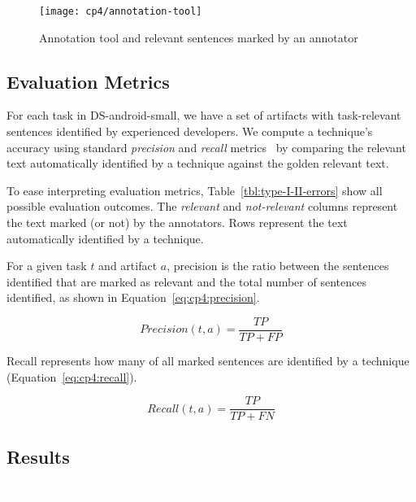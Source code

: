 \begin{figure}
    \centering
    \texttt{[image: cp4/annotation-tool]}
    \caption{Annotation tool and relevant sentences marked by an annotator}
    \label{fig:corpus-annotation-tool}
\end{figure}



\subsection{Evaluation Metrics}

For each task in \acs{DS-android-small}, we have a set of artifacts with task-relevant sentences identified by experienced developers. We  
compute a technique's accuracy using standard \textit{precision} and \textit{recall} metrics~\cite{Manning2009IR} by comparing the relevant text automatically identified by a technique
against the golden relevant text.



To ease interpreting evaluation metrics, Table~\ref{tbl:type-I-II-errors} show all possible evaluation outcomes. The \textit{relevant} and \textit{not-relevant} columns represent the text 
marked (or not) by the annotators. Rows represent the text automatically identified by a technique.








For a given task $t$ and artifact $a$, precision is the ratio between the sentences identified that are marked as relevant and the total number of sentences identified, as shown in Equation~\ref{eq:cp4:precision}.


\begin{equation}
\label{eq:cp4:precision}    
    Precision(t, a) = \frac{TP}{TP + FP}
\end{equation}


Recall represents how many of all marked sentences are identified by a technique (Equation~\ref{eq:cp4:recall}).



\begin{equation}
\label{eq:cp4:recall}        
    Recall(t, a) = \frac{TP}{TP + FN}
\end{equation}

\vspace{3mm}




\subsection{Results}
\textcolor{white}{force ident} %


